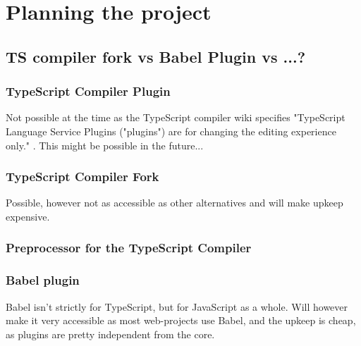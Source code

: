 
\chapter{Planning the project}        %

\section{TS compiler fork vs Babel Plugin vs ...?}

\subsection{TypeScript Compiler Plugin}

Not possible at the time as the TypeScript compiler wiki specifies "TypeScript Language Service Plugins ("plugins") are for changing the editing experience only." \cite{tscplugin}. This might be possible in the future...

\subsection{TypeScript Compiler Fork}

Possible, however not as accessible as other alternatives and will make upkeep expensive.

\subsection{Preprocessor for the TypeScript Compiler}

\subsection{Babel plugin}

Babel isn't strictly for TypeScript, but for JavaScript as a whole. Will however make it very accessible as most web-projects use Babel, and the upkeep is cheap, as plugins are pretty independent from the core.
